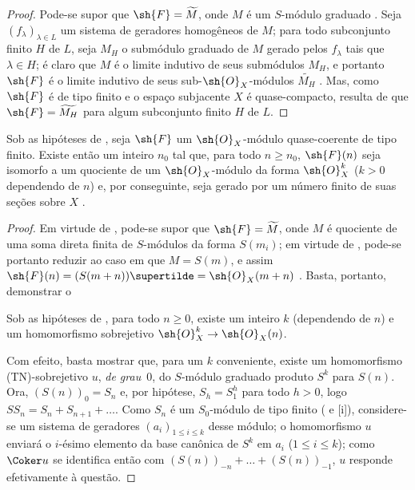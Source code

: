 \documentclass[oneside,10pt]{amsart}
\makeatletter
\renewcommand{\leq}{\leqslant}
\renewcommand{\geq}{\geqslant}
\newcommand{\ega@arrow}[2]{\mathchoice{#1}{#2}{#2}{#2}}
\renewcommand{\to}{\ega@arrow{\longrightarrow}{\rightarrow}}
\newcommand{\oldpage}[2][]{\marginnote{\normalfont\footnotesize\textbf{#1}~|~#2}\ignorespaces}
\let\EGAOriginalLabel\label
\renewcommand{\label}[1]{\phantomsection\EGAOriginalLabel{#1}}
\makeatother
\begin{document}
\begin{proof}
Pode-se supor que $\sh{F}=\widetilde{M}$, onde $M$ é um $S$-módulo graduado .
Seja $(f_\lambda)_{\lambda\in L}$ um sistema de geradores homogêneos de $M$;
para todo subconjunto finito $H$ de $L$, seja $M_H$ o submódulo graduado de $M$ gerado pelos $f_\lambda$ tais que $\lambda\in H$;
é claro que $M$ é o limite indutivo de seus submódulos $M_H$, e portanto $\sh{F}$ é o limite indutivo de seus sub-$\sh{O}_X$-módulos $\widetilde{M_H}$ .
Mas, como $\sh{F}$ é de tipo finito e o espaço subjacente $X$ é quase-compacto, resulta de  que $\sh{F}=\widetilde{M_H}$ para algum subconjunto finito $H$ de $L$.
\end{proof}

\begin{corollary}[2.7.9]
\label{II.2.7.9}
Sob as hipóteses de , seja $\sh{F}$ um $\sh{O}_X$-módulo quase-coerente de tipo finito.
Existe então um inteiro $n_0$ tal que, para todo $n\geq n_0$, $\sh{F}(n)$ seja isomorfo a um quociente de um $\sh{O}_X$-módulo da forma $\sh{O}_X^k$ ($k>0$ dependendo de $n$) e, por conseguinte, seja gerado por um número finito de suas seções sobre $X$ .
\end{corollary}

\begin{proof}
Em virtude de , pode-se supor que $\sh{F}=\widetilde{M}$, onde $M$ é quociente de uma soma direta finita de $S$-módulos da forma $S(m_i)$;
em virtude de , pode-se portanto reduzir ao caso em que $M=S(m)$, e assim $\sh{F}(n)=(S(m+n))\supertilde=\sh{O}_X(m+n)$ .
Basta, portanto, demonstrar o
\oldpage[II]{41}
  \begin{lemma}[2.7.9.1]
  \label{II.2.7.9.1}
  Sob as hipóteses de , para todo $n\geq0$, existe um inteiro $k$ (dependendo de $n$) e um homomorfismo sobrejetivo $\sh{O}_X^k\to\sh{O}_X(n)$.
  \end{lemma}

Com efeito, basta  mostrar que, para um $k$ conveniente, existe um homomorfismo (TN)-sobrejetivo $u$, \emph{de grau~$0$}, do $S$-módulo graduado produto $S^k$ para $S(n)$.
Ora, $(S(n))_0=S_n$ e, por hipótese, $S_h=S_1^h$ para todo $h>0$, logo $SS_n=S_n+S_{n+1}+\ldots$.
Como $S_n$ é um $S_0$-módulo de tipo finito ( e [i]), considere-se um sistema de geradores $(a_i)_{1\leq i\leq k}$ desse módulo;
o homomorfismo $u$ enviará o $i$-ésimo elemento da base canônica de $S^k$ em $a_i$ ($1\leq i\leq k$);
como $\Coker u$ se identifica então com $(S(n))_{-n}+\ldots+(S(n))_{-1}$, $u$ responde efetivamente à questão.
\end{proof}
\end{document}
